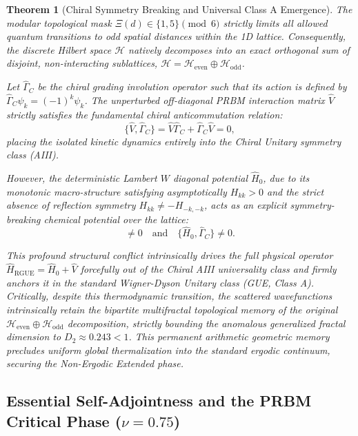 \documentclass[aps,prl,preprint,superscriptaddress,floatfix]{revtex4-2}
\newtheorem{theorem}{Theorem}[section]
\newcommand{\Hilb}{\mathcal{H}}
\begin{document}
\begin{theorem}[Chiral Symmetry Breaking and Universal Class A Emergence]
\label{thm:chiral_breaking}
The modular topological mask $\Xi(d) \in \{1,5\} \pmod 6$ strictly limits all allowed quantum transitions to \emph{odd} spatial distances within the 1D lattice. Consequently, the discrete Hilbert space $\Hilb$ natively decomposes into an exact orthogonal sum of disjoint, non-interacting sublattices, $\Hilb = \Hilb_{\text{even}} \oplus \Hilb_{\text{odd}}$.

Let $\hat{\Gamma}_C$ be the chiral grading involution operator such that its action is defined by $\hat{\Gamma}_C \psi_k = (-1)^k \psi_k$. The unperturbed off-diagonal PRBM interaction matrix $\hat{V}$ strictly satisfies the fundamental chiral anticommutation relation:
\begin{equation}
    \{ \hat{V}, \hat{\Gamma}_C \} = \hat{V}\hat{\Gamma}_C + \hat{\Gamma}_C\hat{V} = 0,
\end{equation}
placing the isolated kinetic dynamics entirely into the Chiral Unitary symmetry class (AIII).

However, the deterministic Lambert $W$ diagonal potential $\hat{H}_0$, due to its monotonic macro-structure satisfying asymptotically $H_{kk} > 0$ and the strict absence of reflection symmetry $H_{kk} \neq -H_{-k,-k}$, acts as an explicit symmetry-breaking chemical potential over the lattice:
\begin{equation}
    [\hat{H}_0, \hat{\Gamma}_C] \neq 0 \quad \text{and} \quad \{ \hat{H}_0, \hat{\Gamma}_C \} \neq 0.
\end{equation}

This profound structural conflict intrinsically drives the full physical operator $\hat{H}_{\text{RGUE}} = \hat{H}_0 + \hat{V}$ forcefully out of the Chiral AIII universality class and firmly anchors it in the standard Wigner-Dyson Unitary class (GUE, Class A). Critically, despite this thermodynamic transition, the scattered wavefunctions intrinsically retain the bipartite multifractal topological memory of the original $\Hilb_{\text{even}} \oplus \Hilb_{\text{odd}}$ decomposition, strictly bounding the anomalous generalized fractal dimension to $D_2 \approx 0.243 < 1$. This permanent arithmetic geometric memory precludes uniform global thermalization into the standard ergodic continuum, securing the Non-Ergodic Extended phase.
\end{theorem}

\subsection{Essential Self-Adjointness and the PRBM Critical Phase (\texorpdfstring{$\nu = 0.75$}{nu = 0.75})}
\end{document}
